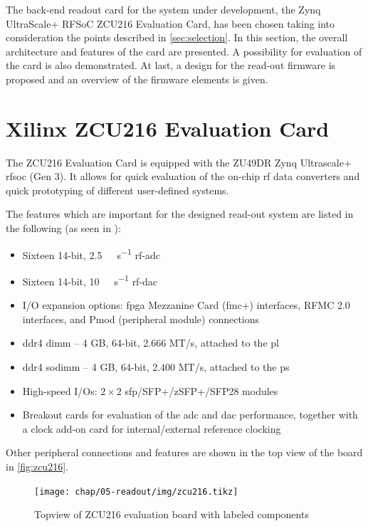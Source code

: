 The back-end readout card for the system under development, the Zynq UltraScale+ RFSoC ZCU216 Evaluation Card, has been chosen taking into consideration the points described in \autoref{sec:selection}.
In this section, the overall architecture and features of the card are presented.
A possibility for evaluation of the card is also demonstrated.
At last, a design for the read-out firmware is proposed and an overview of the firmware elements is given. 

\section{Xilinx ZCU216 Evaluation Card}
The ZCU216 Evaluation Card is equipped with the ZU49DR Zynq Ultrascale+ \gls{rfsoc} (Gen 3). 
It allows for quick evaluation of the on-chip \gls{rf} data converters and quick prototyping of different user-defined systems.

The features which are important for the designed read-out system are listed in the following (as seen in \cite{zcu216}):
\begin{itemize}[noitemsep]
	\item Sixteen 14-bit, \SI{2.5}{\giga \sample \per \second} \gls{rf}-\gls{adc}
	\item Sixteen 14-bit, \SI{10}{\giga \sample \per \second} \gls{rf}-\gls{dac}
	\item I/O expansion options: \gls{fpga} Mezzanine Card (\gls{fmc}+) interfaces, RFMC 2.0 interfaces, and Pmod (peripheral module) connections
	\item \gls{ddr4} \gls{dimm} -- 4 GB, 64-bit, 2.666 MT/s, attached to the \gls{pl}
	\item \gls{ddr4} \gls{sodimm} -- 4 GB, 64-bit, 2.400 MT/s, attached to the \gls{ps}
	\item High-speed I/Os: $2\times2$ \gls{sfp}/SFP+/zSFP+/SFP28 modules
	\item Breakout cards for evaluation of the \gls{adc} and \gls{dac} performance, together with a clock add-on card for internal/external reference clocking
\end{itemize}
Other peripheral connections and features are shown in the top view of the board in \autoref{fig:zcu216}. 

\begin{figure}[tb]
	\centering
	\texttt{[image: chap/05-readout/img/zcu216.tikz]}
	\caption{Topview of ZCU216 evaluation board with labeled components \cite{zcu216}}
	\label{fig:zcu216}
\end{figure}

